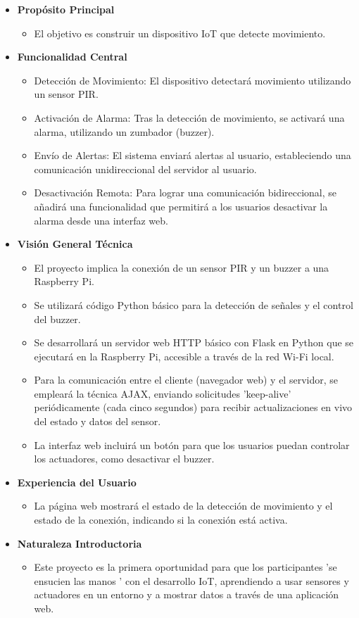 \documentclass{report}
\begin{document}
\begin{itemize}
    \item \textbf{Propósito Principal}
    \begin{itemize}
        \item El objetivo es construir un dispositivo IoT que detecte movimiento.
    \end{itemize}
    \item \textbf{Funcionalidad Central}
    \begin{itemize}
        \item Detección de Movimiento: El dispositivo detectará movimiento utilizando un sensor PIR.
        \item Activación de Alarma: Tras la detección de movimiento, se activará una alarma, utilizando un zumbador (buzzer).
        \item Envío de Alertas: El sistema enviará alertas al usuario, estableciendo una comunicación unidireccional del servidor al usuario.
        \item Desactivación Remota: Para lograr una comunicación bidireccional, se añadirá una funcionalidad que permitirá a los usuarios desactivar la alarma 
        desde una interfaz web.
    \end{itemize}
    \item \textbf{Visión General Técnica}
    \begin{itemize}
        \item El proyecto implica la conexión de un sensor PIR y un buzzer a una Raspberry Pi.
        \item Se utilizará código Python básico para la detección de señales y el control del buzzer.
        \item Se desarrollará un servidor web HTTP básico con Flask en Python que se ejecutará en la Raspberry Pi, accesible a través de la red Wi-Fi local.
        \item Para la comunicación entre el cliente (navegador web) y el servidor, se empleará la técnica AJAX, enviando solicitudes  'keep-alive' 
        periódicamente (cada cinco segundos) para recibir actualizaciones en vivo del estado y datos del sensor.
        \item La interfaz web incluirá un botón para que los usuarios puedan controlar los actuadores, como desactivar el buzzer.
    \end{itemize}
    \item \textbf{Experiencia del Usuario}
    \begin{itemize}
        \item La página web mostrará el estado de la detección de movimiento y el estado de la conexión, indicando si la conexión está activa.
    \end{itemize}
        \item \textbf{Naturaleza Introductoria}
    \begin{itemize}
        \item Este proyecto es la primera oportunidad para que los participantes  'se ensucien las manos ' con el desarrollo IoT, aprendiendo a usar sensores y 
        actuadores en un entorno y a mostrar datos a través de una aplicación web.
    \end{itemize}
\end{itemize}
\end{document}
